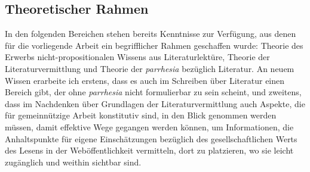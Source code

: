 \documentclass[fontsize=12pt]{scrartcl}
\begin{document}
\subsection{Theoretischer Rahmen}
\label{subsec:2.5}

In den folgenden Bereichen stehen bereits Kenntnisse zur Verf\"ugung, aus denen f\"ur die vorliegende Arbeit ein begrifflicher Rahmen geschaffen wurde: Theorie des Erwerbs nicht-pro\-po\-si\-ti\-o\-na\-len Wissens aus Li\-te\-ra\-tur\-lekt\"ure, Theorie der Li\-te\-ra\-tur\-ver\-mitt\-lung und Theorie der \textit{parrhesia} bez\"uglich Li\-te\-ra\-tur. An neuem Wissen erarbeite ich erstens, dass es auch im Schrei\-ben \"uber Li\-te\-ra\-tur einen Bereich gibt, der ohne \textit{parrhesia} nicht formulierbar zu sein scheint, und zweitens, dass im Nachdenken \"uber Grundlagen der Li\-te\-ra\-tur\-ver\-mitt\-lung auch Aspekte, die f\"ur gemeinn\"utzige Arbeit konstitutiv sind, in den Blick genommen werden m\"ussen, damit effektive Wege gegangen werden k\"onnen, um Informationen, die Anhaltspunkte f\"ur eigene Einsch\"atzungen bez\"uglich des ge\-sell\-schaftlichen Werts des Lesens in der Web\"of\-fent\-lichkeit vermitteln, dort zu platzieren, wo sie leicht zug\"ang\-lich und weithin sichtbar sind. 
\end{document}
